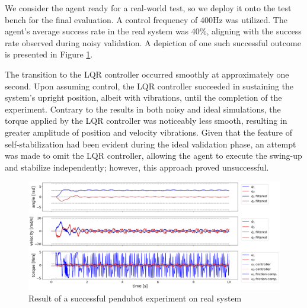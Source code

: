 We consider the agent ready for a real-world test, so we deploy it onto the test bench for the final evaluation. A control frequency of 400Hz was utilized. The agent's average success rate in the real system was 40\%, aligning with the success rate observed during noisy validation. A depiction of one such successful outcome is presented in Figure \ref{fig:pendubot_real_working}. 

The transition to the LQR controller occurred smoothly at approximately one second. Upon assuming control, the LQR controller succeeded in sustaining the system's upright position, albeit with vibrations, until the completion of the experiment. Contrary to the results in both noisy and ideal simulations, the torque applied by the LQR controller was noticeably less smooth, resulting in greater amplitude of position and velocity vibrations. Given that the feature of self-stabilization had been evident during the ideal validation phase, an attempt was made to omit the LQR controller, allowing the agent to execute the swing-up and stabilize independently; however, this approach proved unsuccessful.

\begin{figure}[H]
    \centering
    \includegraphics[width=1.0\linewidth]{figures/hardware_result/pendubot_real_system_working.png}
    \caption{Result of a successful pendubot experiment on real system}
    \label{fig:pendubot_real_working}
\end{figure}



\cleardoublepage
